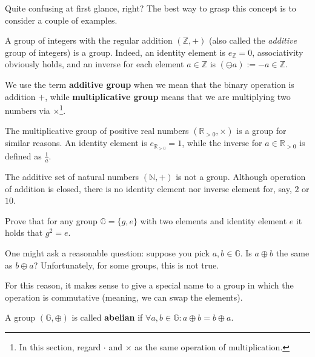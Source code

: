 \documentclass[../lecture-notes-148x210.tex]{subfiles}
\begin{document}
Quite confusing at first glance, right? The best way to grasp this concept is to consider a couple of examples.

\begin{example}
    A group of integers with the regular addition $(\mathbb{Z},+)$ (also called the \textit{additive} group of integers) is a group. Indeed, an identity element is $e_{\mathbb{Z}}=0$, associativity obviously holds, and an inverse for each element $a \in \mathbb{Z}$ is $(\ominus a) := -a \in \mathbb{Z}$. 
\end{example}

\begin{remark}
    We use the term \textbf{additive group} when we mean that the binary operation is addition $+$, while \textbf{multiplicative group} means that we are multiplying two numbers via $\times$\footnote{In this section, regard $\cdot$ and $\times$ as the same operation of multiplication.}.
\end{remark}

\begin{example}
    The multiplicative group of positive real numbers $(\mathbb{R}_{> 0}, \times)$ is a group for similar reasons. An identity element is $e_{\mathbb{R}_{>0}} = 1$, while the inverse for $a \in \mathbb{R}_{>0}$ is defined as $\frac{1}{a}$.
\end{example}

\begin{example}
    The additive set of natural numbers $(\mathbb{N}, +)$ is not a group. Although operation of addition is closed, there is no identity element nor inverse element for, say, $2$ or $10$.
\end{example}

\begin{exercise}
    Prove that for any group $\mathbb{G} = \{g, e\}$ with two elements and
    identity element $e$ it holds that $g^2 = e$.
\end{exercise}

One might ask a reasonable question: suppose you pick $a,b \in \mathbb{G}$. Is $a \oplus b$ the same as $b \oplus a$? Unfortunately, for some groups, this is not true. 

For this reason, it makes sense to give a special name to a group in which the operation is commutative (meaning, we can swap the elements).

\begin{definition}
    A group $(\mathbb{G},\oplus)$ is called \textbf{abelian} if $\forall a,b \in \mathbb{G}: a \oplus b = b \oplus a$.
\end{definition}
\end{document}
